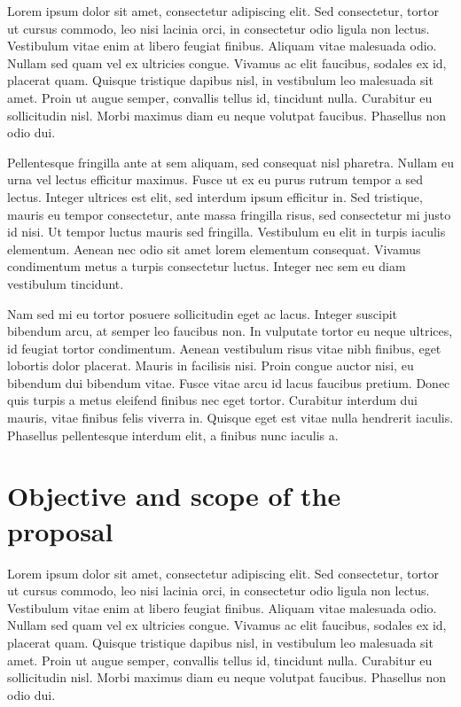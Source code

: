 Lorem ipsum dolor sit amet, consectetur adipiscing elit. Sed consectetur, tortor ut cursus commodo, leo nisi lacinia orci, in consectetur odio ligula non lectus. Vestibulum vitae enim at libero feugiat finibus. Aliquam vitae malesuada odio. Nullam sed quam vel ex ultricies congue. Vivamus ac elit faucibus, sodales ex id, placerat quam. Quisque tristique dapibus nisl, in vestibulum leo malesuada sit amet. Proin ut augue semper, convallis tellus id, tincidunt nulla. Curabitur eu sollicitudin nisl. Morbi maximus diam eu neque volutpat faucibus. Phasellus non odio dui.

Pellentesque fringilla ante at sem aliquam, sed consequat nisl pharetra. Nullam eu urna vel lectus efficitur maximus. Fusce ut ex eu purus rutrum tempor a sed lectus. Integer ultrices est elit, sed interdum ipsum efficitur in. Sed tristique, mauris eu tempor consectetur, ante massa fringilla risus, sed consectetur mi justo id nisi. Ut tempor luctus mauris sed fringilla. Vestibulum eu elit in turpis iaculis elementum. Aenean nec odio sit amet lorem elementum consequat. Vivamus condimentum metus a turpis consectetur luctus. Integer nec sem eu diam vestibulum tincidunt.

Nam sed mi eu tortor posuere sollicitudin eget ac lacus. Integer suscipit bibendum arcu, at semper leo faucibus non. In vulputate tortor eu neque ultrices, id feugiat tortor condimentum. Aenean vestibulum risus vitae nibh finibus, eget lobortis dolor placerat. Mauris in facilisis nisi. Proin congue auctor nisi, eu bibendum dui bibendum vitae. Fusce vitae arcu id lacus faucibus pretium. Donec quis turpis a metus eleifend finibus nec eget tortor. Curabitur interdum dui mauris, vitae finibus felis viverra in. Quisque eget est vitae nulla hendrerit iaculis. Phasellus pellentesque interdum elit, a finibus nunc iaculis a.

\section{Objective and scope of the proposal}
Lorem ipsum dolor sit amet, consectetur adipiscing elit. Sed consectetur, tortor ut cursus commodo, leo nisi lacinia orci, in consectetur odio ligula non lectus. Vestibulum vitae enim at libero feugiat finibus. Aliquam vitae malesuada odio. Nullam sed quam vel ex ultricies congue. Vivamus ac elit faucibus, sodales ex id, placerat quam. Quisque tristique dapibus nisl, in vestibulum leo malesuada sit amet. Proin ut augue semper, convallis tellus id, tincidunt nulla. Curabitur eu sollicitudin nisl. Morbi maximus diam eu neque volutpat faucibus. Phasellus non odio dui.

